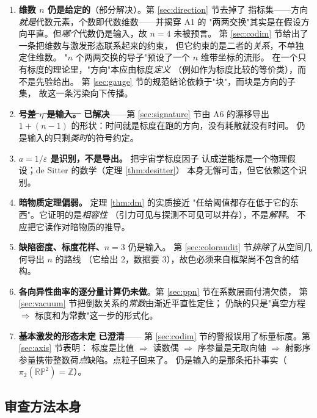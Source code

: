 \documentclass[11pt,a4paper]{article}
\theoremstyle{sudef}
\begin{document}
\begin{enumerate}[leftmargin=1.8em]
\item \textbf{维数 $n$ 仍是给定的}（部分解决）。第 \ref{sec:direction} 节去掉了
      指标集——方向\emph{就是}代数元素，个数即代数维数——并揭穿 A1 的
      "两两交换"其实是在假设方向平直。但\emph{哪个}代数仍是输入，故 $n=4$ 未被预言。
      第 \ref{sec:codim} 节给出了一条把维数与激发形态联系起来的约束，
      但它约束的是二者的\emph{关系}，不单独定住维数。
      "$n$ 个两两交换的导子"预设了一个 $n$ 维带坐标的流形。
      在一个只有标度的理论里，"方向"本应由标度\emph{定义}
      （例如作为标度比较的等价类），而不是先验给出。
      第 \ref{sec:gauge} 节的规范结论依赖于"块"，而块是方向的子集，
      故这一条污染向下传播。
\item \sout{\textbf{号差 $\eta$ 是输入。}} \textbf{已解决}——第 \ref{sec:signature} 节由 A6
      的漂移导出 $1+(n-1)$ 的形状：时间就是标度在跑的方向，没有耗散就没有时间。
      仍是输入的只剩\emph{类时}的符号约定。
\item \textbf{$a=1/\varepsilon$ 是识别，不是导出。} 把宇宙学标度因子
      认成逆能标是一个物理假设；de Sitter 的数学（定理 \ref{thm:desitter}）
      本身无懈可击，但它依赖这个识别。
\item \textbf{暗物质定理偏弱。} 定理 \ref{thm:dm} 的实质接近
      "任给阈值都存在低于它的东西"。它证明的是\emph{相容性}
      （引力可见与探测不可见可以并存），不是\emph{解释}。
      不应把它读作对暗物质的推导。
\item \textbf{缺陷密度、标度花样、$n=3$} 仍是输入。
      第 \ref{sec:coloraudit} 节\emph{排除}了从空间几何导出 $n$ 的路线
      （它给出 $2$，数据要 $3$），故色必须来自框架尚不包含的结构。
\item \textbf{各向异性曲率的逐分量计算仍未做}。第 \ref{sec:ppn} 节在系数层面付清欠债，
      第 \ref{sec:vacuum} 节把倒数关系的\emph{常数}由渐近平直性定住；
      仍缺的只是"真空方程 $\Rightarrow$ 标度和为常数"这一步的形式化。
\item \sout{\textbf{基本激发的形态未定}} \textbf{已澄清}——
      第 \ref{sec:codim} 节的警报误用了标量标度。第 \ref{sec:axis} 节表明：
      标度是比值 $\Rightarrow$ 读数偶 $\Rightarrow$ 序参量是无取向轴 $\Rightarrow$
      射影序参量携带整数荷\emph{点}缺陷。点粒子回来了。
      仍是输入的是那条拓扑事实（$\pi_2(\mathbb{RP}^2)=\mathbb{Z}$）。
\end{enumerate}

\subsection{审查方法本身}
\end{document}
